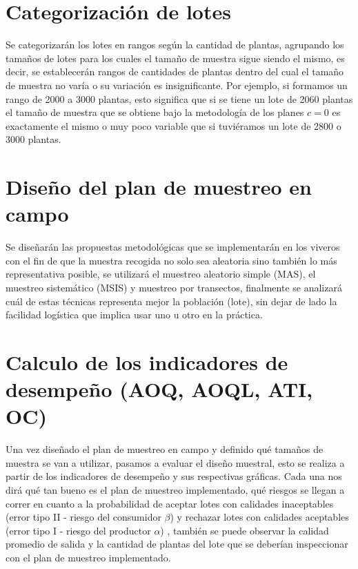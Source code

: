 \section{Categorizaci\'{o}n de lotes} 

Se categorizar\'{a}n los lotes en rangos seg\'{u}n la cantidad de plantas, agrupando los tama\~{n}os de lotes para los cuales el tama\~{n}o de muestra sigue siendo el mismo, es decir, se establecer\'{a}n rangos de cantidades de plantas dentro del cual el tama\~{n}o de muestra no var\'{i}a o su variaci\'{o}n es insignificante. Por ejemplo, si formamos un rango de 2000 a 3000 plantas, esto significa que si se tiene un lote de 2060 plantas el tama\~{n}o de muestra que se obtiene bajo la metodolog\'{i}a de los planes $c=0$ es exactamente el mismo o muy poco variable que si tuvi\'{e}ramos un lote de 2800 o 3000 plantas.

\section{Dise\~{n}o del plan de muestreo en campo}

Se dise\~{n}ar\'{a}n las propuestas metodol\'{o}gicas que se implementar\'{a}n en los viveros con el fin de que la muestra recogida no solo sea aleatoria sino tambi\'{e}n lo m\'{a}s representativa posible, se utilizar\'{a} el muestreo aleatorio simple (MAS), el muestreo sistem\'{a}tico (MSIS) y muestreo por transectos, finalmente se analizar\'{a} cu\'{a}l de estas t\'{e}cnicas representa mejor la poblaci\'{o}n (lote), sin dejar de lado la facilidad log\'{i}stica que implica usar uno u otro en la pr\'{a}ctica.


\section{Calculo de los indicadores de desempe\~{n}o (AOQ, AOQL, ATI, OC)}

Una vez dise\~{n}ado el plan de muestreo en campo y definido qu\'{e} tama\~{n}os de muestra se van a utilizar, pasamos a evaluar el dise\~{n}o muestral, esto se realiza a partir de los indicadores de desempe\~{n}o y sus respectivas gr\'{a}ficas. Cada una nos dir\'{a} qu\'{e} tan bueno es el plan de muestreo implementado, qu\'{e} riesgos se llegan a correr en cuanto a la probabilidad de aceptar lotes con calidades inaceptables (error tipo II - riesgo del consumidor $\beta$) y rechazar lotes con calidades aceptables (error tipo I - riesgo del productor $\alpha$) , tambi\'{e}n se puede observar la calidad promedio de salida y la cantidad de plantas del lote que se deber\'{i}an inspeccionar con el plan de muestreo implementado.

